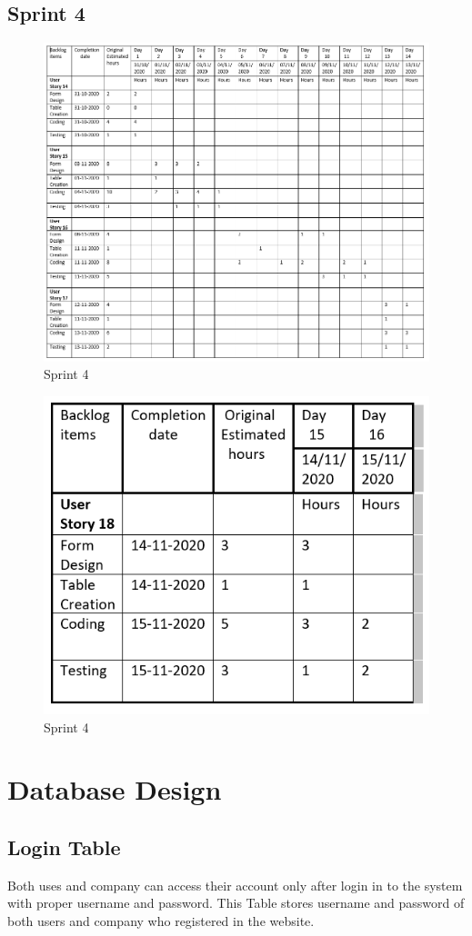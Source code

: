 \documentclass[a4paper,12pt]{report}
\begin{document}
\subsection {Sprint 4}
\begin{figure}[bph]
	\centering
	\includegraphics[width=0.9\linewidth]{img/sprint/sp4a1}
	\caption{Sprint 4}
\end{figure}
\pagebreak
\begin{figure}[bph]
	\centering
	\includegraphics[width=0.5\linewidth]{img/sprint/sp4a2}
	\caption{Sprint 4}
\end{figure}
\section{Database Design}
\subsection{Login Table}
Both uses and company can access their account only after login in to the system with proper username and password. This Table stores username and password of both users and company who registered in the website.
\end{document}
